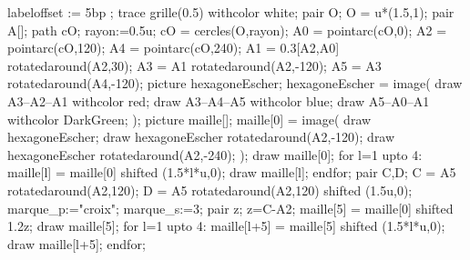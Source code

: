 \begin{exercice*}
\begin{changemargin}{0mm}{0mm}
\begin{enumerate}
            \hspace*{-10mm}
            \begin{Geometrie}[CoinHD={(9u,4u)}]
                labeloffset := 5bp ;
                trace grille(0.5) withcolor white;
                pair O;
                O = u*(1.5,1);
                pair A[];
                path cO;
                rayon:=0.5u;
                cO = cercles(O,rayon);
                A0 = pointarc(cO,0);
                A2 = pointarc(cO,120);
                A4 = pointarc(cO,240);
                A1 = 0.3[A2,A0] rotatedaround(A2,30);
                A3 = A1 rotatedaround(A2,-120);
                A5 = A3 rotatedaround(A4,-120);        
                picture hexagoneEscher;
                hexagoneEscher = image(
                    draw A3--A2--A1 withcolor red;        
                        draw A3--A4--A5 withcolor blue;        
                        draw A5--A0--A1 withcolor DarkGreen;
                );
                picture maille[];
                maille[0] = image(
                    draw hexagoneEscher;
                    draw hexagoneEscher rotatedaround(A2,-120);
                    draw hexagoneEscher rotatedaround(A2,-240);
                );        
                draw maille[0];
                for l=1 upto 4:
                    maille[l] = maille[0] shifted (1.5*l*u,0);
                    draw maille[l];
                endfor;
                pair C,D;
                C = A5 rotatedaround(A2,120);
                D = A5 rotatedaround(A2,120) shifted (1.5u,0);
                marque_p:="croix";
                marque_s:=3;
                pair z;
                z=C-A2;
                maille[5] = maille[0] shifted 1.2z;
                draw maille[5];
                for l=1 upto 4:
                    maille[l+5] = maille[5] shifted (1.5*l*u,0);
                        draw maille[l+5];
                endfor;            
            \end{Geometrie}
        \end{enumerate}
    \end{changemargin}
\end{exercice*}
